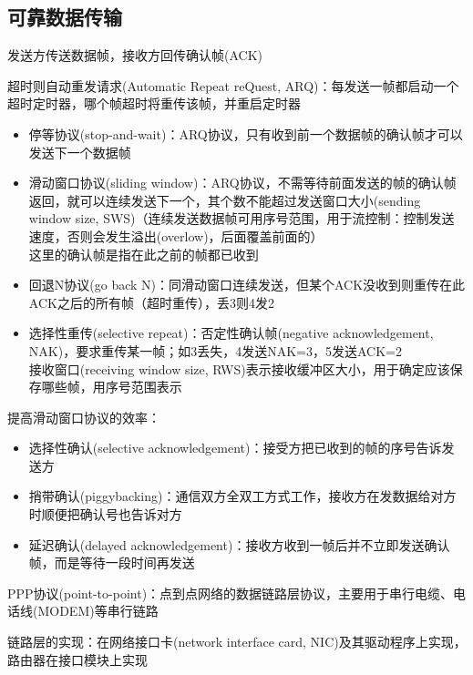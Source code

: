 \subsection{可靠数据传输}
发送方传送数据帧，接收方回传确认帧(ACK)

超时则自动重发请求(Automatic Repeat reQuest, ARQ)：每发送一帧都启动一个超时定时器，哪个帧超时将重传该帧，并重启定时器

\begin{itemize}
	\item 停等协议(stop-and-wait)：ARQ协议，只有收到前一个数据帧的确认帧才可以发送下一个数据帧
	\item 滑动窗口协议(sliding window)：ARQ协议，不需等待前面发送的帧的确认帧返回，就可以连续发送下一个，其个数不能超过发送窗口大小(sending window size, SWS)（连续发送数据帧可用序号范围，用于流控制：控制发送速度，否则会发生溢出(overlow)，后面覆盖前面的）\\
	这里的确认帧是指在此之前的帧都已收到
	\item 回退N协议(go back N)：同滑动窗口连续发送，但某个ACK没收到则重传在此ACK之后的所有帧（超时重传），丢3则4发2
	\item 选择性重传(selective repeat)：否定性确认帧(negative acknowledgement, NAK)，要求重传某一帧；如3丢失，4发送NAK=3，5发送ACK=2\\
	接收窗口(receiving window size, RWS)表示接收缓冲区大小，用于确定应该保存哪些帧，用序号范围表示
\end{itemize}


提高滑动窗口协议的效率：
\begin{itemize}
	\item 选择性确认(selective acknowledgement)：接受方把已收到的帧的序号告诉发送方
	\item 捎带确认(piggybacking)：通信双方全双工方式工作，接收方在发数据给对方时顺便把确认号也告诉对方
	\item 延迟确认(delayed acknowledgement)：接收方收到一帧后并不立即发送确认帧，而是等待一段时间再发送
\end{itemize}

PPP协议(point-to-point)：点到点网络的数据链路层协议，主要用于串行电缆、电话线(MODEM)等串行链路

链路层的实现：在网络接口卡(network interface card, NIC)及其驱动程序上实现，路由器在接口模块上实现
